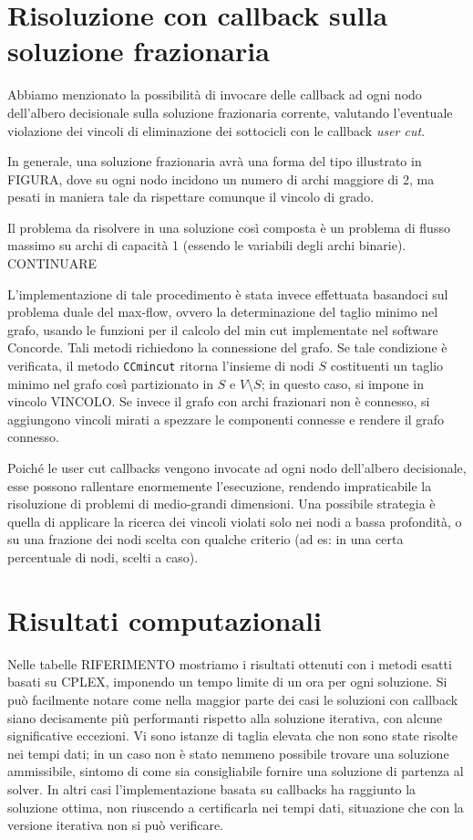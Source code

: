 \section{Risoluzione con callback sulla soluzione frazionaria}
Abbiamo menzionato la possibilità di invocare delle callback ad ogni nodo dell'albero decisionale sulla soluzione frazionaria corrente, valutando l'eventuale violazione dei vincoli di eliminazione dei sottocicli con le callback \textit{user cut}.

In generale, una soluzione frazionaria avrà una forma del tipo illustrato in FIGURA, dove su ogni nodo incidono un numero di archi maggiore di 2, ma pesati in maniera tale da rispettare comunque il vincolo di grado.

Il problema da risolvere in una soluzione così composta è un problema di flusso massimo su archi di capacità 1 (essendo le variabili degli archi binarie). CONTINUARE

L'implementazione di tale procedimento è stata invece effettuata basandoci sul problema duale del max-flow, ovvero la determinazione del taglio minimo nel grafo, usando le funzioni per il calcolo del min cut implementate nel software Concorde. Tali metodi richiedono la connessione del grafo. Se tale condizione è verificata, il metodo \texttt{CCmincut} ritorna l'insieme di nodi $S$ costituenti un taglio minimo nel grafo così partizionato in $S$ e $V\setminus S$; in questo caso, si impone in vincolo VINCOLO. Se invece il grafo con archi frazionari non è connesso, si aggiungono vincoli mirati a spezzare le componenti connesse e rendere il grafo connesso.

Poiché le user cut callbacks vengono invocate ad ogni nodo dell'albero decisionale, esse possono rallentare enormemente l'esecuzione, rendendo impraticabile la risoluzione di problemi di medio-grandi dimensioni. Una possibile strategia è quella di applicare la ricerca dei vincoli violati solo nei nodi a bassa profondità, o su una frazione dei nodi scelta con qualche criterio (ad es: in una certa percentuale di nodi, scelti a caso).

\section{Risultati computazionali}
Nelle tabelle RIFERIMENTO mostriamo i risultati ottenuti con i metodi esatti basati su CPLEX, imponendo un tempo limite di un ora per ogni soluzione. Si può facilmente notare come nella maggior parte dei casi le soluzioni con callback siano decisamente più performanti rispetto alla soluzione iterativa, con alcune significative eccezioni. Vi sono istanze di taglia elevata che non sono state risolte nei tempi dati; in un caso non è stato nemmeno possibile trovare una soluzione ammissibile, sintomo di come sia consigliabile fornire una soluzione di partenza al solver. In altri casi l'implementazione basata su callbacks ha raggiunto la soluzione ottima, non riuscendo a certificarla nei tempi dati, situazione che con la versione iterativa non si può verificare.


